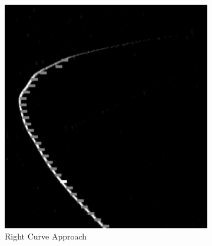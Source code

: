         \begin{figure}[H]
              \centering
              \begin{subfigure}[b]{0.32\textwidth}
                 \includegraphics[width=\textwidth,height=0.2\textheight]{visionpipeline/curverightapprach.png}
                 \caption{Right Curve Approach}
                 \label{fig:appoachRight}
              \end{subfigure}
              \hfill 
              \begin{subfigure}[b]{0.32\textwidth}

\end{subfigure}
\end{figure}
